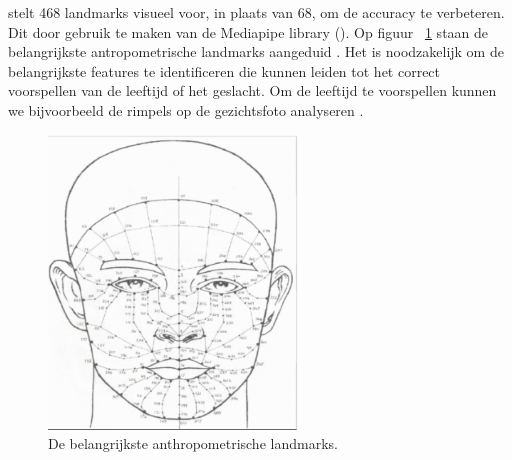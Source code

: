 \textcite{Sanil2023} stelt 468 landmarks visueel voor, in plaats van 68, om de accuracy te verbeteren. Dit door gebruik te maken van de Mediapipe library (\textcite{Zubair2021}). Op figuur {~\ref{fig:landmarks}} staan de belangrijkste antropometrische landmarks aangeduid . Het is noodzakelijk om de belangrijkste features te identificeren die kunnen leiden tot het correct voorspellen van de leeftijd of het geslacht. Om de leeftijd te voorspellen kunnen we bijvoorbeeld de rimpels op de gezichtsfoto analyseren \autocite{Kwon1994}. 
\begin{figure}
    \centering
    \includegraphics[width=\columnwidth]{graphics/faciallandmarks.png}
    \caption{\label{fig:landmarks}De belangrijkste anthropometrische landmarks\autocite{Sanil2023}.}
\end{figure}

